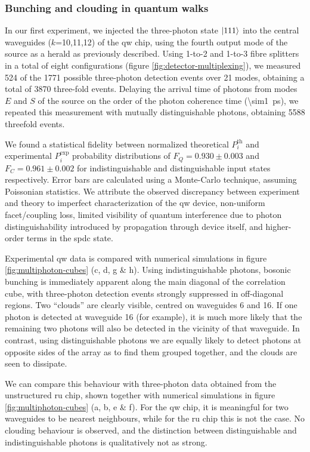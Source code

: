 \subsubsection{Bunching and clouding in quantum walks}
In our first experiment, we injected the three-photon state $\mbox{$ | 111 \rangle $}$ into the central waveguides ($k$=10,11,12) of the \gls{qw} chip, using the fourth output mode of the source as a herald as previously described. Using 1-to-2 and 1-to-3 fibre splitters in a total of eight configurations (figure \ref{fig:detector-multiplexing}), we measured 524 of the 1771 possible three-photon detection events over 21 modes, obtaining a total of 3870 three-fold events. Delaying the arrival time of photons from modes $E$ and $S$ of the source on the order of the photon coherence time (\SI{\sim1}{\pico\second}), we repeated this measurement with mutually distinguishable photons, obtaining 5588 threefold events.


\newcommand{\prbth}{P_i^\text{th}}
\newcommand{\prbex}{P_i^\text{exp}}
We found a statistical fidelity between normalized theoretical $\prbth$ and experimental $\prbex$ probability distributions of $F_Q = 0.930 \pm 0.003$ and $F_C = 0.961 \pm 0.002$ for indistinguishable and distinguishable input states respectively. Error bars are calculated using a Monte-Carlo technique, assuming Poissonian statistics. We attribute the observed discrepancy between experiment and theory to imperfect characterization of the \gls{qw} device, non-uniform facet/coupling loss, limited visibility of quantum interference due to photon distinguishability introduced by propagation through device itself, and higher-order terms in the \gls{spdc} state.

Experimental \gls{qw} data is compared with numerical simulations in figure \ref{fig:multiphoton-cubes} (c, d, g \& h). Using indistinguishable photons, bosonic bunching is immediately apparent along the main diagonal of the correlation cube, with three-photon detection events strongly suppressed in off-diagonal regions.  Two ``clouds'' are clearly visible, centred on waveguides 6 and 16. If one photon is detected at waveguide 16 (for example), it is much more likely that the remaining two photons will also be detected in the vicinity of that waveguide. 
In contrast, using distinguishable photons we are equally likely to detect photons at opposite sides of the array as to find them grouped together, and the clouds are seen to dissipate.  

We can compare this behaviour with three-photon data obtained from the unstructured \gls{ru} chip, shown together with numerical simulations in figure \ref{fig:multiphoton-cubes} (a, b, e \& f). For the \gls{qw} chip, it is meaningful for two waveguides to be nearest neighbours, while for the \gls{ru} chip this is not the case. No clouding behaviour is observed, and the distinction between distinguishable and indistinguishable photons is qualitatively not as strong. 

